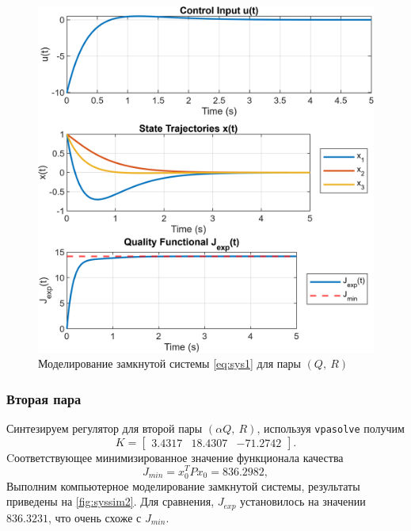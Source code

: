 \begin{figure}[H]
    \centering
    \includegraphics[width=0.9\linewidth]{figs/1_sim1.png}
    \caption{Моделирование замкнутой системы \eqref{eq:sys1} для пары $(Q,\ R)$}
    \label{fig:syssim1}
\end{figure}

\subsubsection{Вторая пара}

Синтезируем регулятор для второй пары $(\alpha Q,\ R)$, используя \texttt{vpasolve}
получим
\begin{equation*}
    K=\begin{bmatrix}
        3.4317  & 18.4307 & -71.2742
    \end{bmatrix}.
\end{equation*}
Cоответствующее минимизированное значение функционала качества
\begin{equation*}
    J_{min}=x_0^TPx_0=836.2982,
\end{equation*}
Выполним компьютерное моделирование замкнутой системы,
результаты приведены на \autoref{fig:syssim2}. Для сравнения, $J_{exp}$ установилось на
значении $836.3231$, что очень схоже с $J_{min}$.


